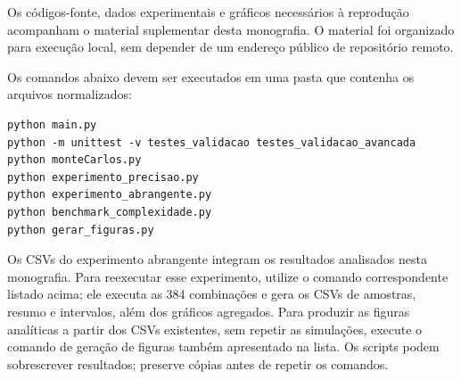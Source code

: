 \documentclass[12pt,openright,oneside,a4paper,brazil]{abntex2}
\begin{document}
\begin{apendicesenv}
Os códigos-fonte, dados experimentais e gráficos necessários à reprodução acompanham o material suplementar desta monografia. O material foi organizado para execução local, sem depender de um endereço público de repositório remoto.

Os comandos abaixo devem ser executados em uma pasta que contenha os arquivos normalizados:
\begin{verbatim}
python main.py
python -m unittest -v testes_validacao testes_validacao_avancada
python monteCarlos.py
python experimento_precisao.py
python experimento_abrangente.py
python benchmark_complexidade.py
python gerar_figuras.py
\end{verbatim}

Os CSVs do experimento abrangente integram os resultados analisados nesta monografia. Para reexecutar esse experimento, utilize o comando correspondente listado acima; ele executa as 384 combinações e gera os CSVs de amostras, resumo e intervalos, além dos gráficos agregados. Para produzir as figuras analíticas a partir dos CSVs existentes, sem repetir as simulações, execute o comando de geração de figuras também apresentado na lista. Os scripts podem sobrescrever resultados; preserve cópias antes de repetir os comandos.
\end{apendicesenv}
\end{document}
